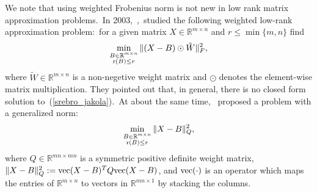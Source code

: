 \documentclass[twoside,11pt]{article}
\begin{document}
We note that using weighted Frobenius norm is not new in low rank matrix approximation problems.~In 2003,~\citet{srebro},~studied the following weighted low-rank approximation problem:~for a given matrix $X\in\mathbb{R}^{m\times n}$ and $r\le\min\{m,n\}$ find
\begin{align}\label{srebro_jakola}
\min_{\substack{{B}\in\mathbb{R}^{m\times n}\\{\rm r}({B})\le r}}\|({X}-B)\odot \tilde{W}\|_{F}^2,
\end{align}
where $\tilde{W}\in\mathbb{R}^{m\times n}$ is a non-negetive weight matrix and $\odot$ denotes the element-wise matrix multiplication. They pointed out that, in general, there is no closed form solution to~(\ref{srebro_jakola}).~At about the same time,~\citet{manton} proposed a problem with a generalized norm:
\begin{align}\label{manton}
\min_{\substack{{B}\in\mathbb{R}^{m\times n}\\{\rm r}({B})\le r}}\|X-B\|_{Q}^2,
\end{align}
where $Q \in \mathbb{R}^{mn\times mn}$ is a symmetric positive definite weight matrix,~$\|X-B\|_Q^2:={\rm vec}(X-B)^TQ{\rm vec}(X-B)$, and ${\rm vec}(\cdot)$ is an operator which maps the entries of $\mathbb{R}^{m\times n}$ to vectors in $\mathbb{R}^{mn\times 1}$ by stacking the columns.%

\end{document}
